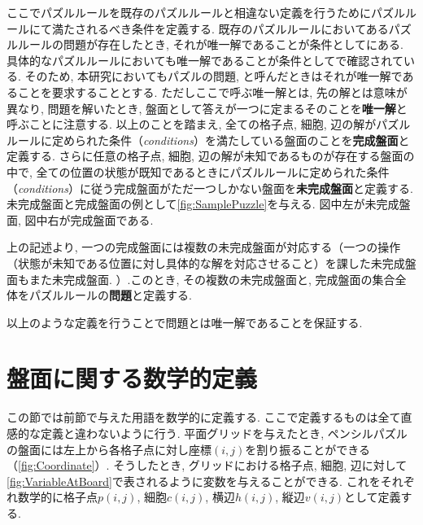 ここでパズルルールを既存のパズルルールと相違ない定義を行うためにパズルルールにて満たされるべき条件を定義する. 既存のパズルルールにおいてあるパズルルールの問題が存在したとき, それが唯一解であることが条件としてにある. 具体的なパズルルールにおいても唯一解であることが条件としてで確認されている. そのため, 本研究においてもパズルの問題, と呼んだときはそれが唯一解であることを要求することとする. ただしここで呼ぶ唯一解とは, 先の解とは意味が異なり, 問題を解いたとき, 盤面として答えが一つに定まるそのことを\textbf{唯一解}と呼ぶことに注意する.
以上のことを踏まえ, 全ての格子点, 細胞, 辺の解がパズルルールに定められた条件（\textit{conditions}）を満たしている盤面のことを\textbf{完成盤面}と定義する. さらに任意の格子点, 細胞, 辺の解が未知であるものが存在する盤面の中で, 全ての位置の状態が既知であるときにパズルルールに定められた条件（\textit{conditions}）に従う完成盤面がただ一つしかない盤面を\textbf{未完成盤面}と定義する. 未完成盤面と完成盤面の例として\cref{fig:SamplePuzzle}を与える. 図中左が未完成盤面, 図中右が完成盤面である.



上の記述より, 一つの完成盤面には複数の未完成盤面が対応する（一つの操作（状態が未知である位置に対し具体的な解を対応させること）を課した未完成盤面もまた未完成盤面. ）.このとき, その複数の未完成盤面と, 完成盤面の集合全体をパズルルールの\textbf{問題}と定義する.

以上のような定義を行うことで問題とは唯一解であることを保証する.



\section{盤面に関する数学的定義}\label{section:MathematicalDefinition}
この節では前節で与えた用語を数学的に定義する. ここで定義するものは全て直感的な定義と違わないように行う.
平面グリッドを与えたとき, ペンシルパズルの盤面には左上から各格子点に対し座標$(i,j)$を割り振ることができる（\cref{fig:Coordinate}）. そうしたとき, グリッドにおける格子点, 細胞, 辺に対して\cref{fig:VariableAtBoard}で表されるように変数を与えることができる.
これをそれぞれ数学的に格子点$p(i,j)$, 細胞$c(i,j)$, 横辺$h(i,j)$, 縦辺$v(i,j)$として定義する.


